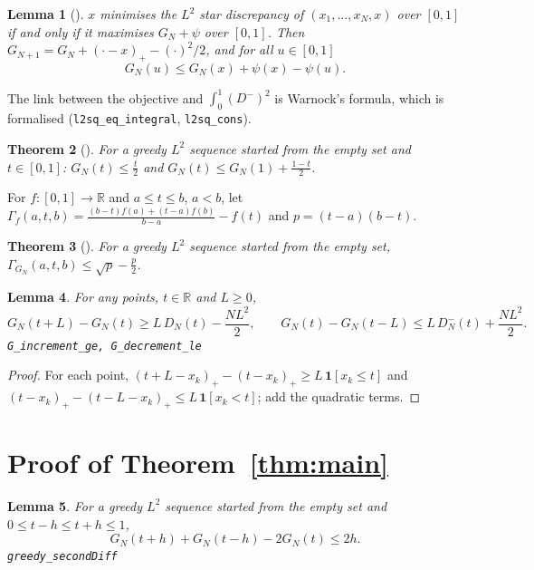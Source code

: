 \documentclass[11pt]{amsart}
\newtheorem{theorem}{Theorem}
\newtheorem{lemma}[theorem]{Lemma}
\theoremstyle{remark}
\newcommand{\lean}[1]{\texttt{\small #1}}
\begin{document}
\begin{lemma}[{\cite[Lemma 3]{Den}}]\label{lem:step}
$x$ minimises the $L^2$ star discrepancy of $(x_1,\dots,x_N,x)$ over $[0,1]$ if
and only if it maximises $G_N+\psi$ over $[0,1]$. Then
$G_{N+1}=G_N+(\cdot-x)_+-(\cdot)^2/2$, and for all $u\in[0,1]$
\begin{equation}\label{eq:max}
G_N(u)\le G_N(x)+\psi(x)-\psi(u).
\end{equation}
\end{lemma}

The link between the objective and $\int_0^1(D^-)^2$ is Warnock's formula, which
is formalised (\lean{l2sq\_eq\_integral}, \lean{l2sq\_cons}).

\begin{theorem}[{\cite[Theorem 4]{Den}}]\label{thm:env}
For a greedy $L^2$ sequence started from the empty set and $t\in[0,1]$:
$G_N(t)\le\frac t2$ and $G_N(t)\le G_N(1)+\frac{1-t}2$.
\end{theorem}

For $f:[0,1]\to\mathbb R$ and $a\le t\le b$, $a<b$, let
$\Gamma_f(a,t,b)=\frac{(b-t)f(a)+(t-a)f(b)}{b-a}-f(t)$ and $p=(t-a)(b-t)$.

\begin{theorem}[{\cite[Theorem 6]{Den}}]\label{thm:chord}
For a greedy $L^2$ sequence started from the empty set,
$\Gamma_{G_N}(a,t,b)\le\sqrt p-\frac p2$.
\end{theorem}

\begin{lemma}\label{lem:slope}
For any points, $t\in\mathbb R$ and $L\ge0$,
\[
G_N(t+L)-G_N(t)\ge L\,D_N(t)-\frac{NL^2}2,\qquad
G_N(t)-G_N(t-L)\le L\,D_N^-(t)+\frac{NL^2}2 .
\]
\lean{G\_increment\_ge, G\_decrement\_le}
\end{lemma}

\begin{proof}
For each point, $(t+L-x_k)_+-(t-x_k)_+\ge L\,\mathbf 1[x_k\le t]$ and
$(t-x_k)_+-(t-L-x_k)_+\le L\,\mathbf 1[x_k<t]$; add the quadratic terms.
\end{proof}

\section{Proof of Theorem~\ref{thm:main}}

\begin{lemma}\label{lem:sd}
For a greedy $L^2$ sequence started from the empty set and
$0\le t-h\le t+h\le1$,
\[
G_N(t+h)+G_N(t-h)-2G_N(t)\le2h .
\]
\lean{greedy\_secondDiff}
\end{lemma}
\end{document}
